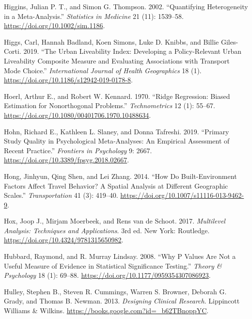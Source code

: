\documentclass[
  11pt,
  openany]{memoir}
\newlength{\cslhangindent}
\newlength{\cslentryspacingunit} %
\newenvironment{CSLReferences}[2] %
 {%
  \setlength{\parindent}{0pt}
  \ifodd #1
  \let\oldpar\par
  \def\par{\hangindent=\cslhangindent\oldpar}
  \fi
  \setlength{\parskip}{#2\cslentryspacingunit}
 }%
 {}
\begin{document}
\begin{CSLReferences}{1}{0}
\leavevmode{}%
Higgins, Julian P. T., and Simon G. Thompson. 2002. {``Quantifying Heterogeneity in a Meta-Analysis.''} \emph{Statistics in Medicine} 21 (11): 1539--58. \url{https://doi.org/10.1002/sim.1186}.

\leavevmode{}%
Higgs, Carl, Hannah Badland, Koen Simons, Luke D. Knibbs, and Billie Giles-Corti. 2019. {``The {Urban Liveability Index}: Developing a Policy-Relevant Urban Liveability Composite Measure and Evaluating Associations with Transport Mode Choice.''} \emph{International Journal of Health Geographics} 18 (1). \url{https://doi.org/10.1186/s12942-019-0178-8}.

\leavevmode{}%
Hoerl, Arthur E., and Robert W. Kennard. 1970. {``Ridge {Regression}: Biased {Estimation} for {Nonorthogonal Problems}.''} \emph{Technometrics} 12 (1): 55--67. \url{https://doi.org/10.1080/00401706.1970.10488634}.

\leavevmode{}%
Hohn, Richard E., Kathleen L. Slaney, and Donna Tafreshi. 2019. {``Primary {Study Quality} in {Psychological Meta}-{Analyses}: An {Empirical Assessment} of {Recent Practice}.''} \emph{Frontiers in Psychology} 9: 2667. \url{https://doi.org/10.3389/fpsyg.2018.02667}.

\leavevmode{}%
Hong, Jinhyun, Qing Shen, and Lei Zhang. 2014. {``How Do Built-Environment Factors Affect Travel Behavior? A Spatial Analysis at Different Geographic Scales.''} \emph{Transportation} 41 (3): 419--40. \url{https://doi.org/10.1007/s11116-013-9462-9}.

\leavevmode{}%
Hox, Joop J., Mirjam Moerbeek, and Rens van de Schoot. 2017. \emph{Multilevel {Analysis}: Techniques and {Applications}}. 3rd ed. {New York}: {Routledge}. \url{https://doi.org/10.4324/9781315650982}.

\leavevmode{}%
Hubbard, Raymond, and R. Murray Lindsay. 2008. {``Why {P Values Are Not} a {Useful Measure} of {Evidence} in {Statistical Significance Testing}.''} \emph{Theory \& Psychology} 18 (1): 69--88. \url{https://doi.org/10.1177/0959354307086923}.

\leavevmode{}%
Hulley, Stephen B., Steven R. Cummings, Warren S. Browner, Deborah G. Grady, and Thomas B. Newman. 2013. \emph{Designing {Clinical Research}}. {Lippincott Williams \& Wilkins}. \url{https://books.google.com?id=_b62TBnoppYC}.


\end{CSLReferences}
\end{document}
